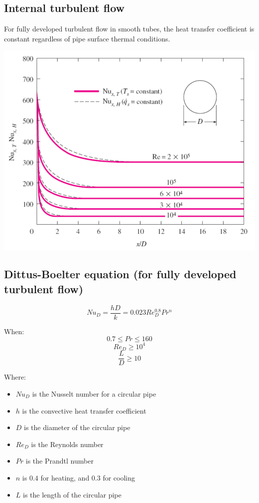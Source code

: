 \documentclass[11pt]{article}
\begin{document}
 \newpage

\subsection{Internal turbulent flow}
\label{sec:org07f3afc}
For fully developed turbulent flow in smooth tubes, the heat transfer coefficient is constant regardless of pipe surface thermal conditions.
\begin{center}
\includegraphics[width=.9\linewidth]{./images/internal-turbulent-flow-graph.png}
\end{center}

 \newpage

\subsection{Dittus-Boelter equation (for fully developed turbulent flow)}
\label{sec:org955224d}
\[Nu_D = \frac{hD}{k} = 0.023 Re_D^{0.8} Pr^n\]

When:
\[0.7 \le Pr \le 160\]
\[Re_D \ge 10^4\]
\[\frac{L}{D} \ge 10\]

Where:
\begin{itemize}
\item \(Nu_D\) is the Nusselt number for a circular pipe
\item \(h\) is the convective heat transfer coefficient
\item \(D\) is the diameter of the circular pipe
\item \(Re_D\) is the Reynolds number
\item \(Pr\) is the Prandtl number
\item \(n\) is \(0.4\) for heating, and \(0.3\) for cooling
\item \(L\) is the length of the circular pipe
\end{itemize}
\end{document}
